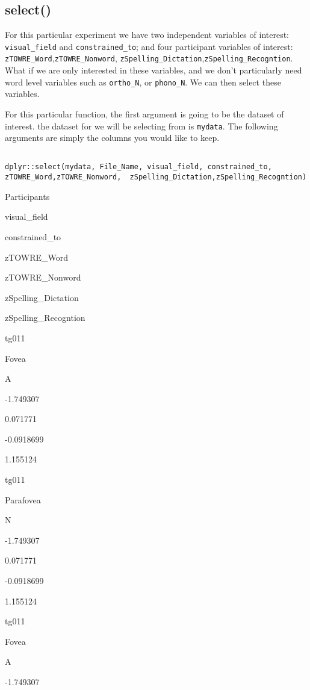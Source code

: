 \documentclass[
]{book}
\begin{document}
\hypertarget{select}{%
\subsection{select()}\label{select}}

For this particular experiment we have two independent variables of interest: \texttt{visual\_field} and \texttt{constrained\_to}; and four participant variables of interest: \texttt{zTOWRE\_Word},\texttt{zTOWRE\_Nonword}, \texttt{zSpelling\_Dictation},\texttt{zSpelling\_Recogntion}. What if we are only interested in these variables, and we don't particularly need word level variables such as \texttt{ortho\_N}, or \texttt{phono\_N}. We can then select these variables.

For this particular function, the first argument is going to be the dataset of interest. the dataset for we will be selecting from is \texttt{mydata}. The following arguments are simply the columns you would like to keep.

\begin{verbatim}

dplyr::select(mydata, File_Name, visual_field, constrained_to, zTOWRE_Word,zTOWRE_Nonword,  zSpelling_Dictation,zSpelling_Recogntion)
\end{verbatim}

Participants

visual\_field

constrained\_to

zTOWRE\_Word

zTOWRE\_Nonword

zSpelling\_Dictation

zSpelling\_Recogntion

tg011

Fovea

A

-1.749307

0.071771

-0.0918699

1.155124

tg011

Parafovea

N

-1.749307

0.071771

-0.0918699

1.155124

tg011

Fovea

A

-1.749307
\end{document}
